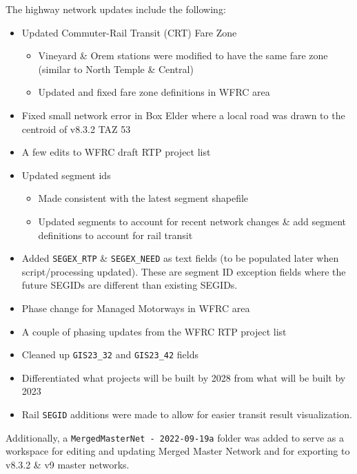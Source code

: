 \documentclass[
  letterpaper,
  DIV=11,
  numbers=noendperiod]{scrreprt}
\providecommand{\tightlist}{%
  \setlength{\itemsep}{0pt}\setlength{\parskip}{0pt}}\usepackage{longtable,booktabs,array}
\begin{document}
The highway network updates include the following:

\begin{itemize}
\tightlist
\item
  Updated Commuter-Rail Transit (CRT) Fare Zone

  \begin{itemize}
  \tightlist
  \item
    Vineyard \& Orem stations were modified to have the same fare zone
    (similar to North Temple \& Central)
  \item
    Updated and fixed fare zone definitions in WFRC area
  \end{itemize}
\item
  Fixed small network error in Box Elder where a local road was drawn to
  the centroid of v8.3.2 TAZ 53
\item
  A few edits to WFRC draft RTP project list
\item
  Updated segment ids

  \begin{itemize}
  \tightlist
  \item
    Made consistent with the latest segment shapefile
  \item
    Updated segments to account for recent network changes \& add
    segment definitions to account for rail transit
  \end{itemize}
\item
  Added \texttt{SEGEX\_RTP} \& \texttt{SEGEX\_NEED} as text fields (to
  be populated later when script/processing updated). These are segment
  ID exception fields where the future SEGIDs are different than
  existing SEGIDs.
\item
  Phase change for Managed Motorways in WFRC area
\item
  A couple of phasing updates from the WFRC RTP project list
\item
  Cleaned up \texttt{GIS23\_32} and \texttt{GIS23\_42} fields
\item
  Differentiated what projects will be built by 2028 from what will be
  built by 2023
\item
  Rail \texttt{SEGID} additions were made to allow for easier transit
  result visualization.
\end{itemize}

Additionally, a \texttt{MergedMasterNet\ -\ 2022-09-19a} folder was
added to serve as a workspace for editing and updating Merged Master
Network and for exporting to v8.3.2 \& v9 master networks.
\end{document}

